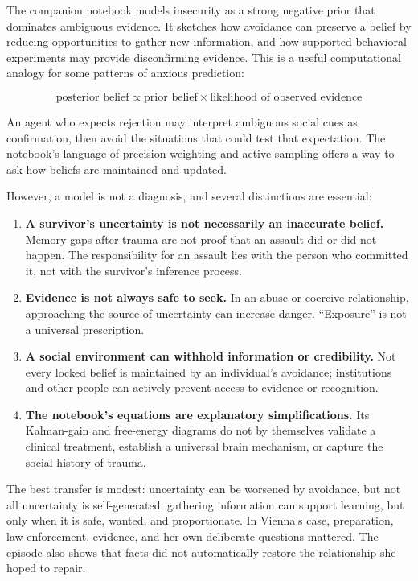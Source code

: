 \documentclass[
  11pt,
  letterpaper,
]{article}
\providecommand{\tightlist}{%
  \setlength{\itemsep}{0pt}\setlength{\parskip}{0pt}}
\begin{document}
The companion notebook models insecurity as a strong negative prior that
dominates ambiguous evidence. It sketches how avoidance can preserve a
belief by reducing opportunities to gather new information, and how
supported behavioral experiments may provide disconfirming evidence.
This is a useful computational analogy for some patterns of anxious
prediction:

\[
\text{posterior belief} \propto
\text{prior belief} \times \text{likelihood of observed evidence}
\]

An agent who expects rejection may interpret ambiguous social cues as
confirmation, then avoid the situations that could test that
expectation. The notebook's language of precision weighting and active
sampling offers a way to ask how beliefs are maintained and updated.

However, a model is not a diagnosis, and several distinctions are
essential:

\begin{enumerate}
\def\labelenumi{\arabic{enumi}.}
\tightlist
\item
  \textbf{A survivor's uncertainty is not necessarily an inaccurate
  belief.} Memory gaps after trauma are not proof that an assault did or
  did not happen. The responsibility for an assault lies with the person
  who committed it, not with the survivor's inference process.
\item
  \textbf{Evidence is not always safe to seek.} In an abuse or coercive
  relationship, approaching the source of uncertainty can increase
  danger. ``Exposure'' is not a universal prescription.
\item
  \textbf{A social environment can withhold information or credibility.}
  Not every locked belief is maintained by an individual's avoidance;
  institutions and other people can actively prevent access to evidence
  or recognition.
\item
  \textbf{The notebook's equations are explanatory simplifications.} Its
  Kalman-gain and free-energy diagrams do not by themselves validate a
  clinical treatment, establish a universal brain mechanism, or capture
  the social history of trauma.
\end{enumerate}

The best transfer is modest: uncertainty can be worsened by avoidance,
but not all uncertainty is self-generated; gathering information can
support learning, but only when it is safe, wanted, and proportionate.
In Vienna's case, preparation, law enforcement, evidence, and her own
deliberate questions mattered. The episode also shows that facts did not
automatically restore the relationship she hoped to repair.
\end{document}
